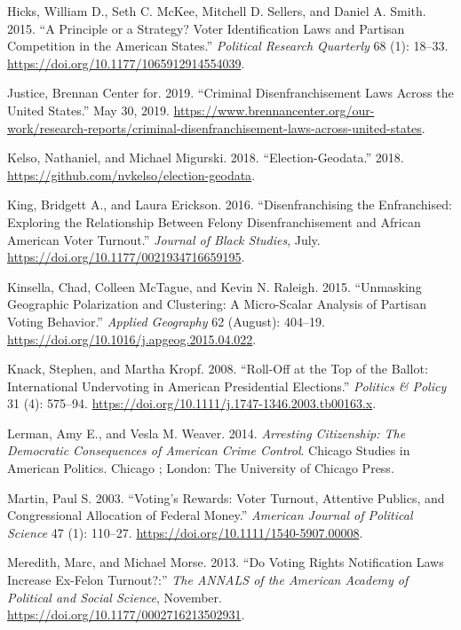 \documentclass[
  12pt,
]{article}
\newlength{\cslhangindent}
\newenvironment{cslreferences}%
  {\setlength{\parindent}{0pt}%
  \everypar{\setlength{\hangindent}{\cslhangindent}}\ignorespaces}%
  {\par}
\begin{document}
\begin{cslreferences}
\leavevmode\hypertarget{ref-Hicks2015}{}%
Hicks, William D., Seth C. McKee, Mitchell D. Sellers, and Daniel A. Smith. 2015. ``A Principle or a Strategy? Voter Identification Laws and Partisan Competition in the American States.'' \emph{Political Research Quarterly} 68 (1): 18--33. \url{https://doi.org/10.1177/1065912914554039}.

\leavevmode\hypertarget{ref-bcj_laws}{}%
Justice, Brennan Center for. 2019. ``Criminal Disenfranchisement Laws Across the United States.'' May 30, 2019. \url{https://www.brennancenter.org/our-work/research-reports/criminal-disenfranchisement-laws-across-united-states}.

\leavevmode\hypertarget{ref-Kelso2018}{}%
Kelso, Nathaniel, and Michael Migurski. 2018. ``Election-Geodata.'' 2018. \url{https://github.com/nvkelso/election-geodata}.

\leavevmode\hypertarget{ref-King2016}{}%
King, Bridgett A., and Laura Erickson. 2016. ``Disenfranchising the Enfranchised: Exploring the Relationship Between Felony Disenfranchisement and African American Voter Turnout.'' \emph{Journal of Black Studies}, July. \url{https://doi.org/10.1177/0021934716659195}.

\leavevmode\hypertarget{ref-Kinsella2015}{}%
Kinsella, Chad, Colleen McTague, and Kevin N. Raleigh. 2015. ``Unmasking Geographic Polarization and Clustering: A Micro-Scalar Analysis of Partisan Voting Behavior.'' \emph{Applied Geography} 62 (August): 404--19. \url{https://doi.org/10.1016/j.apgeog.2015.04.022}.

\leavevmode\hypertarget{ref-Knack2008}{}%
Knack, Stephen, and Martha Kropf. 2008. ``Roll-Off at the Top of the Ballot: International Undervoting in American Presidential Elections.'' \emph{Politics \& Policy} 31 (4): 575--94. \url{https://doi.org/10.1111/j.1747-1346.2003.tb00163.x}.

\leavevmode\hypertarget{ref-Lerman2014}{}%
Lerman, Amy E., and Vesla M. Weaver. 2014. \emph{Arresting Citizenship: The Democratic Consequences of American Crime Control}. Chicago Studies in American Politics. Chicago ; London: The University of Chicago Press.

\leavevmode\hypertarget{ref-Martin2003}{}%
Martin, Paul S. 2003. ``Voting's Rewards: Voter Turnout, Attentive Publics, and Congressional Allocation of Federal Money.'' \emph{American Journal of Political Science} 47 (1): 110--27. \url{https://doi.org/10.1111/1540-5907.00008}.

\leavevmode\hypertarget{ref-Meredith2013}{}%
Meredith, Marc, and Michael Morse. 2013. ``Do Voting Rights Notification Laws Increase Ex-Felon Turnout?:'' \emph{The ANNALS of the American Academy of Political and Social Science}, November. \url{https://doi.org/10.1177/0002716213502931}.


\end{cslreferences}
\end{document}
